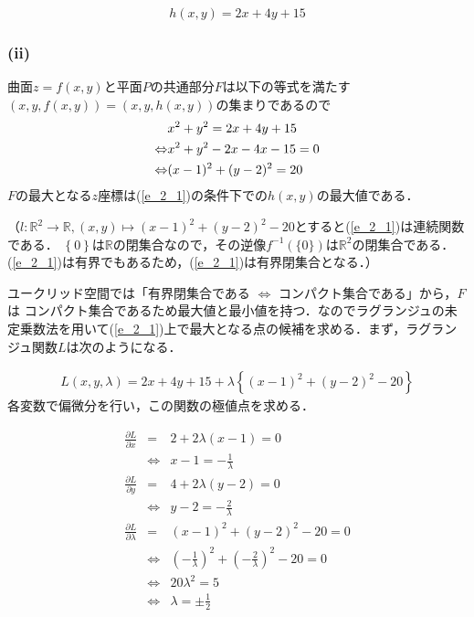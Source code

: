 \documentclass[11pt, titlepage]{jsarticle}
\begin{document}
\begin{equation*}
  h(x,y) = 2x + 4y + 15
\end{equation*}

\newpage
\subsubsection*{(ii)}
曲面$z=f(x,y)$と平面$P$の共通部分$F$は以下の等式を満たす$(x, y, f(x,y))=(x,y,h(x,y))$の集まりであるので
\begin{eqnarray}
  &x^2+y^2=2x+4y+15 \notag\\
  \Leftrightarrow &x^2+y^2-2x-4x-15=0 \notag\\
  \Leftrightarrow &(x-1)^2 + (y-2)^2 = 20 \label{e_2_1}
\end{eqnarray}
$F$の最大となる$z$座標は(\ref{e_2_1})の条件下での$h(x,y)$の最大値である．

（$l: \mathbb R^2 \rightarrow \mathbb R, (x,y)\mapsto (x-1)^2+(y-2)^2-20$とすると(\ref{e_2_1})は連続関数である．
$\left\{ 0 \right\}$は$\mathbb R$の閉集合なので，その逆像$f^{-1}(\{0\})$は$\mathbb R^2$の閉集合である．(\ref{e_2_1})は有界でもあるため，(\ref{e_2_1})は有界閉集合となる．）

ユークリッド空間では「有界閉集合である $\Leftrightarrow$ コンパクト集合である」から，$F$は
コンパクト集合であるため最大値と最小値を持つ．なのでラグランジュの未定乗数法を用いて(\ref{e_2_1})上で最大となる点の候補を求める．まず，ラグランジュ関数$L$は次のようになる．

\begin{eqnarray*}
  L(x,y,\lambda)=2x+4y+15 + \lambda\left\{ (x-1)^2 + (y-2)^2 - 20 \right\}
\end{eqnarray*}
各変数で偏微分を行い，この関数の極値点を求める．

\begin{eqnarray*}
  \frac{\partial L}{\partial x}&=&2+2\lambda(x-1)=0 \\
  &\Leftrightarrow& x-1=-\frac{1}{\lambda} \\
  \frac{\partial L}{\partial y}&=&4+2\lambda(y-2)=0 \\
  &\Leftrightarrow& y-2=-\frac{2}{\lambda} \\
  \frac{\partial L}{\partial \lambda}&=&(x-1)^2 + (y-2)^2-20=0 \\
  &\Leftrightarrow&(-\frac{1}{\lambda})^2 + (-\frac{2}{\lambda})^2-20=0 \\
  &\Leftrightarrow&20\lambda^2=5\\
  &\Leftrightarrow&\lambda=\pm \frac{1}{2}\\
\end{eqnarray*}
\end{document}
